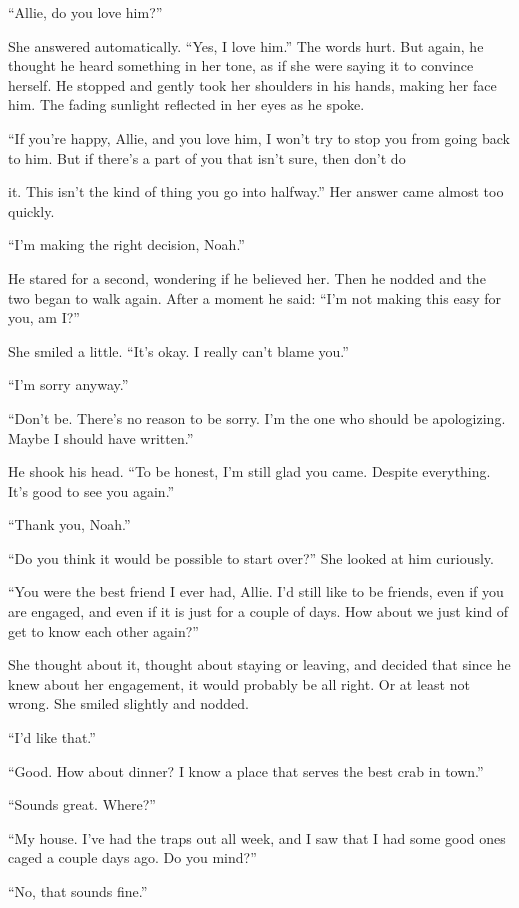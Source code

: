 \documentclass[10pt, twoside, openright]{book}
\begin{document}
``Allie, do you love him?''


She answered automatically. ``Yes, I love him.'' The words hurt. But
again, he thought he heard something in her tone, as if she were saying
it to convince herself. He stopped and gently took her shoulders in his
hands, making her face him. The fading sunlight reflected in her eyes as
he spoke.

``If you're happy, Allie, and you love him, I won't try to stop you from
going back to him. But if there's a part of you that isn't sure, then
don't do

it. This isn't the kind of thing you go into halfway.'' Her answer came
almost too quickly.


``I'm making the right decision, Noah.''


He stared for a second, wondering if he believed her. Then he nodded and
the two began to walk again. After a moment he said: ``I'm not making
this easy for you, am I?''


She smiled a little. ``It's okay. I really can't blame you.''

``I'm sorry anyway.''


``Don't be. There's no reason to be sorry. I'm the one who should be
apologizing. Maybe I should have written.''

He shook his head. ``To be honest, I'm still glad you came. Despite
everything. It's good to see you again.''


``Thank you, Noah.''

``Do you think it would be possible to start over?'' She looked at him
curiously.


``You were the best friend I ever had, Allie. I'd still like to be
friends, even if you are engaged, and even if it is just for a couple of
days. How about we just kind of get to know each other again?''

She thought about it, thought about staying or leaving, and decided that
since he knew about her engagement, it would probably be all right. Or
at least not wrong. She smiled slightly and nodded.


``I'd like that.''


``Good. How about dinner? I know a place that serves the best crab in
town.''


``Sounds great. Where?''


``My house. I've had the traps out all week, and I saw that I had some
good ones caged a couple days ago. Do you mind?''


``No, that sounds fine.''
\end{document}
